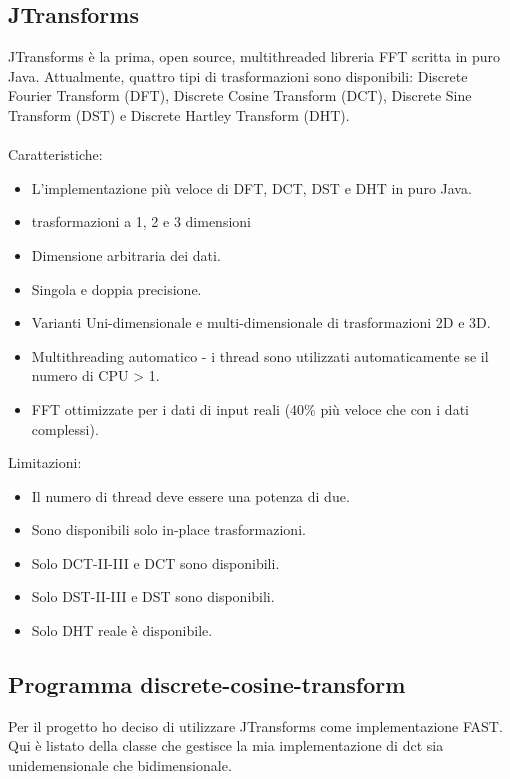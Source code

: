 \documentclass[12pt]{article}
\begin{document}
\subsection{JTransforms}
JTransforms \`e la prima, open source, multithreaded libreria FFT scritta in puro Java. Attualmente, quattro tipi di trasformazioni sono disponibili: Discrete Fourier Transform (DFT), Discrete Cosine Transform (DCT), Discrete Sine Transform (DST) e Discrete Hartley Transform (DHT).\\
\\
Caratteristiche:
\begin{itemize}
\item L'implementazione pi\`u veloce di DFT, DCT, DST e DHT in puro Java.
\item trasformazioni a 1, 2 e 3 dimensioni
\item Dimensione arbitraria dei dati.
\item Singola e doppia precisione.
\item Varianti Uni-dimensionale e multi-dimensionale di trasformazioni 2D e 3D.
\item Multithreading automatico - i thread sono utilizzati automaticamente se il numero di CPU > 1.
\item FFT ottimizzate per i dati di input reali (40\% pi\`u veloce che con i dati complessi).
\end{itemize}
Limitazioni:
\begin{itemize}
\item Il numero di thread deve essere una potenza di due.
\item Sono disponibili solo in-place trasformazioni.
\item Solo DCT-II-III e DCT sono disponibili.
\item Solo DST-II-III e DST sono disponibili.
\item Solo DHT reale \`e disponibile.
\end{itemize}

\subsection{Programma discrete-cosine-transform}
Per il progetto ho deciso di utilizzare JTransforms come implementazione FAST.\\
Qui \`e listato della classe che gestisce la mia implementazione di dct sia unidemensionale che bidimensionale.


\end{document}
